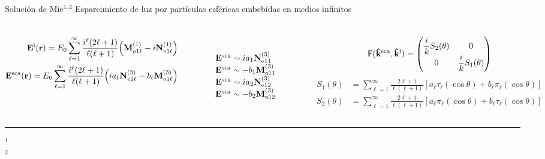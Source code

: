 
\begin{frame}{Solución de Mie$^{1,2}$}
	{Esparcimiento de luz por partículas esféricas embebidas en medios infinitos}
	\scriptsize
\vspace*{-2em}
	\begin{columns}
	 \scriptsize
	\begin{align*}
	\vb{E}^\text{i} (\vb{r})= E_0 \sum_{\ell = 1}^\infty\frac{i^\ell(2\ell+1)}{\ell(\ell+1)}\qty( \vb{M}_{o1\ell}^{(1)} -i \vb{N}_{e1\ell}^{(1)})\\
	\vb{E}^\text{sca} (\vb{r}) = E_0 \sum_{\ell = 1}^\infty\frac{i^\ell(2\ell+1)}{\ell(\ell+1)}\qty(i a_\ell \vb{N}_{e1\ell}^{(3)} -b_\ell \vb{M}_{o1\ell}^{(3)})
	\end{align*}\vspace*{-2.em}
 	 	 \begin{figure}
	\def\svgwidth{1\textwidth}\scriptsize
	\\[-9.5em]
    \fontsize{4}{5}\selectfont \hfill %
    $\vb{E}^\text{sca} \sim  i a_1 \vb{N}^{(3)}_{\text{e}11}$\hfill
    $\vb{E}^\text{sca} \sim  - b_1 \vb{M}^{(3)}_{\text{o}11}$\hfill
    $\vb{E}^\text{sca} \sim  i a_2 \vb{N}^{(3)}_{\text{e}12}$\hfill
    $\vb{E}^\text{sca} \sim  - b_2 \vb{M}^{(3)}_{\text{o}12}$\hfill
\end{figure}
\scriptsize
\vspace*{7em}
$$ \mathbb{F}(\vu{k}^\text{sca},\vu{k}^\text{i})
            = \mqty(\dfrac{i}{k}S_2(\theta) & 0 \\
			0 & \dfrac{i}{k}S_1(\theta)  )$$
			\vspace*{-2.em}
\begin{align*}
S_1(\theta)  &= \sum_{\ell = 1}^\infty \frac{2\ell+1}{\ell(\ell+1)}
						[a_\ell\tau_\ell(\cos\theta)+b_\ell\pi_\ell(\cos\theta)]
\\
S_2(\theta) &= \sum_{\ell = 1}^\infty \frac{2\ell+1}{\ell(\ell+1)}
						[a_\ell\pi_\ell(\cos\theta)+b_\ell\tau_\ell(\cos\theta)]
\end{align*}

	 	 \centering
\begin{figure}
	\def\svgwidth{1\textwidth} \fontsize{4}{5}\selectfont
  \\[1em]
  \def\svgwidth{.95\textwidth} 
\end{figure}
	\end{columns}
	\vspace*{.5em}
	\noindent\rule{.25\textwidth}{0.4pt}
 \begin{spacing}{0}\fontsize{4}{5} \selectfont
	$^1$ \\
	$^2$ 
	\end{spacing}
\end{frame}
